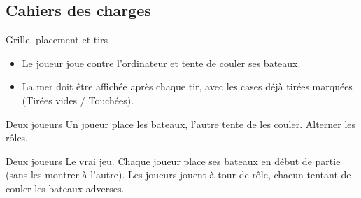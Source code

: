 \subsection*{Cahiers des charges}
\begin{UPSTICahierDesCharges}{Grille, placement et tirs}
\begin{itemize}
  \item Le joueur joue contre l'ordinateur et tente de couler ses bateaux.
  \item La mer doit être affichée après chaque tir, avec les cases déjà tirées marquées (Tirées vides / Touchées).
\end{itemize}
\end{UPSTICahierDesCharges}

\begin{UPSTICahierDesCharges}{Deux joueurs}
Un joueur place les bateaux, l'autre tente de les couler. Alterner les rôles.
\end{UPSTICahierDesCharges}

\begin{UPSTICahierDesCharges}{Deux joueurs}
Le vrai jeu. Chaque joueur place ses bateaux en début de partie (sans les montrer à l'autre). Les joueurs jouent à tour de rôle, chacun tentant de couler les bateaux adverses. 
\end{UPSTICahierDesCharges}

